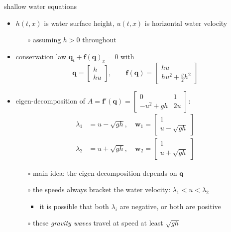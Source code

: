 \documentclass[10pt,hyperref,dvipsnames]{beamer}
\newcommand{\bbf}{\mathbf{f}}
\newcommand{\bq}{\mathbf{q}}
\newcommand{\bw}{\mathbf{w}}
\newcommand{\ds}{\displaystyle}
\begin{document}
\begin{frame}{shallow water equations}

\begin{itemize}
\item $h(t,x)$ is water surface height, $u(t,x)$ is horizontal water velocity
    \begin{itemize}
    \item[$\circ$] assuming $h>0$ throughout
    \end{itemize}
\item conservation law \quad $\bq_t + \bbf(\bq)_x = 0$ with
        $$\bq = \begin{bmatrix} h \\ hu \end{bmatrix}, \qquad \bbf(\bq) = \begin{bmatrix} hu \\ h u^2 + \frac{g}{2} h^2 \end{bmatrix}$$
\item eigen-decomposition of \quad $\ds A=\bbf'(\bq) = \begin{bmatrix} 0 & 1 \\ -u^2 + g h & 2 u \end{bmatrix}$:
\begin{align*}
\lambda_1&=u-\sqrt{gh}, \quad \bw_1 = \begin{bmatrix} 1 \\ u-\sqrt{gh} \end{bmatrix} \\
\lambda_2&=u+\sqrt{gh}, \quad \bw_2 = \begin{bmatrix} 1 \\ u+\sqrt{gh} \end{bmatrix}
\end{align*}

    \begin{itemize}
    \item[$\circ$] main idea: the eigen-decomposition depends on $\bq$
    \item[$\circ$] the speeds always bracket the water velocity: $\lambda_1 < u < \lambda_2$
        \begin{itemize}
        \item it is possible that both $\lambda_i$ are negative, or both are positive
        \end{itemize}
    \item[$\circ$] these \emph{gravity waves} travel at speed at least $\sqrt{gh}$
    \end{itemize}
\end{itemize}
\end{frame}
\end{document}
